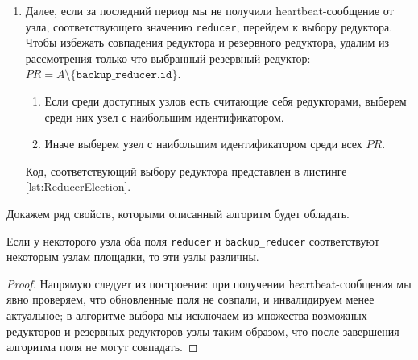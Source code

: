 \begin{enumerate}
    \item Далее, если за последний период мы не получили heartbeat-со\-об\-ще\-ние от узла, соответствующего значению \texttt{reducer},  перейдем к выбору редуктора. Чтобы избежать совпадения редуктора и резервного редуктора, удалим из рассмотрения только что выбранный резервный редуктор: $PR = A \setminus \{ \texttt{backup\_reducer.id} \}$.

    \begin{enumerate}
        \item Если среди доступных узлов есть считающие себя редукторами, выберем среди них узел с наибольшим идентификатором.

        \item Иначе выберем узел с наибольшим идентификатором среди всех $PR$.
    \end{enumerate}
    
    Код, соответствующий выбору редуктора представлен в листинге \ref{lst:ReducerElection}.
    

\end{enumerate}

Докажем ряд свойств, которыми описанный алгоритм будет обладать.

\begin{lemma}
\label{ElectionSafety}
    Если у некоторого узла оба поля \texttt{reducer} и \texttt{backup\_reducer} соответствуют некоторым узлам площадки, то эти узлы различны.
\end{lemma}
\begin{proof}
    Напрямую следует из построения: при получении heartbeat-со\-об\-ще\-ния мы явно проверяем, что обновленные поля не совпали, и инвалидируем менее актуальное; в алгоритме выбора мы исключаем из множества возможных редукторов и резервных редукторов узлы таким образом, что после завершения алгоритма поля не могут совпадать.
\end{proof}

